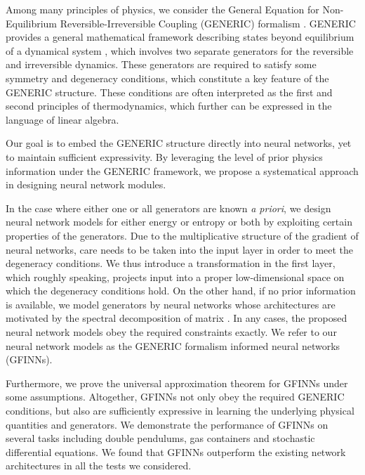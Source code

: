 \documentclass[openacc]{rsproca_new}%
\begin{document}
Among many principles of physics,
we consider the General Equation for Non-Equilibrium Reversible-Irreversible Coupling (GENERIC) formalism \cite{grmela1997dynamics,ottinger1997dynamics,ottinger2005beyond}.
GENERIC provides a general mathematical framework 
describing states beyond equilibrium of a dynamical system \cite{ottinger2005beyond},
which involves two separate generators for the reversible and irreversible dynamics.
These generators are required to satisfy some symmetry and degeneracy conditions,
which constitute a key feature of the GENERIC structure.
These conditions are often interpreted as 
the ﬁrst and second principles of thermodynamics,
which further can be expressed in the language of linear algebra. 



Our goal is to embed the GENERIC structure directly into neural networks, yet to maintain sufficient expressivity.
By leveraging the level of prior physics information under the GENERIC framework,
we propose a systematical approach in designing 
neural network modules.


In the case where either one or all generators are known \textit{a priori},
we design neural network models for either energy or entropy or both
by exploiting certain properties of the generators.
Due to the multiplicative structure of the gradient of neural networks,
care needs to be taken into the input layer
in order to meet the degeneracy conditions.
We thus introduce a transformation in the first layer, which roughly speaking, projects input into a proper low-dimensional space 
on which the degeneracy conditions hold.
On the other hand,
if no prior information is available,
we model generators by
neural networks
whose architectures
are motivated 
by the spectral decomposition of matrix \cite{trefethen1997numerical}.
In any cases,
the proposed neural network models 
obey the required constraints exactly.
We refer to our neural network models 
as the GENERIC formalism informed neural networks (GFINNs).


Furthermore, we prove 
the universal approximation theorem for GFINNs under some assumptions.
Altogether, 
GFINNs not only obey the required GENERIC conditions, but also 
are sufficiently expressive in learning the underlying physical quantities and generators.
We demonstrate the performance of GFINNs 
on several tasks including double pendulums,
gas containers and stochastic differential equations.
We found that GFINNs 
outperform the existing network architectures 
\cite{dietrich2021learning, hernandez2021structure, lee2021machine}
in all the tests we considered.
    
\end{document}
